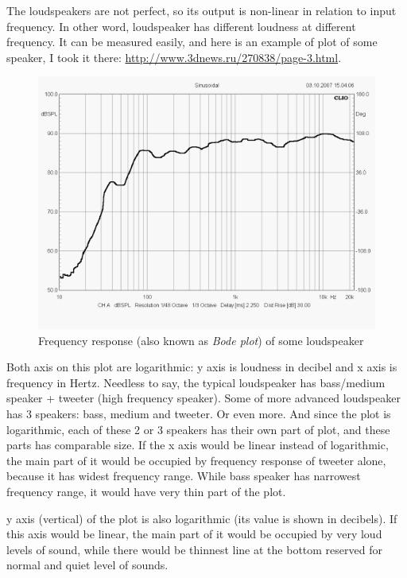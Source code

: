 The loudspeakers are not perfect, so its output is non-linear in relation to input frequency.
In other word, loudspeaker has different loudness at different frequency.
It can be measured easily, and here is an example of plot of some speaker, I took it there:
\url{http://www.3dnews.ru/270838/page-3.html}.

\begin{figure}[H]
\centering
\includegraphics[scale=0.66]{log/65366.png}
\caption{Frequency response (also known as \textit{Bode plot}) of some loudspeaker}
\end{figure}

Both axis on this plot are logarithmic: y axis is loudness in decibel and x axis is frequency in Hertz.
Needless to say, the typical loudspeaker has bass/medium speaker + tweeter (high frequency speaker).
Some of more advanced loudspeaker has 3 speakers: bass, medium and tweeter.
Or even more.
And since the plot is logarithmic, each of these 2 or 3 speakers has their own part of plot, and these parts has comparable size.
If the x axis would be linear instead of logarithmic, the main part of it would be occupied by frequency response of tweeter alone, 
because it has widest frequency range. While bass speaker has narrowest frequency range, it would have very thin part of the plot.

y axis (vertical) of the plot is also logarithmic (its value is shown in decibels).
If this axis would be linear, the main part of it would be occupied by very loud levels of sound, while there would be thinnest line at the bottom
reserved for normal and quiet level of sounds.

